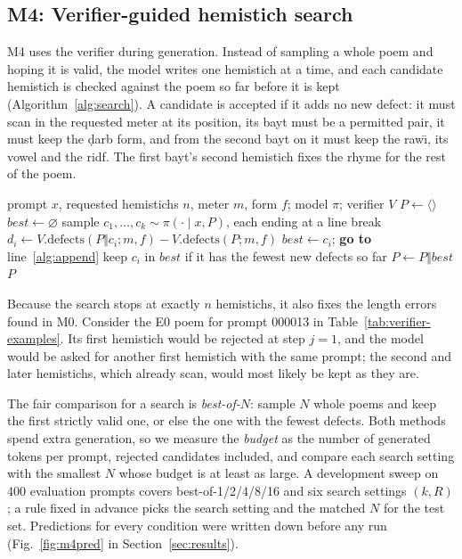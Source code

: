 \subsection{M4: Verifier-guided hemistich search}
\label{sec:m4}
M4 uses the verifier during generation. Instead of sampling a whole poem and hoping it is valid, the model writes one
hemistich at a time, and each candidate hemistich is checked against the poem so far before it is kept
(Algorithm~\ref{alg:search}). A candidate is accepted if it adds no new defect: it must scan in the requested meter at
its position, its bayt must be a permitted pair, it must keep the \d{d}arb form, and from the second bayt on it must
keep the raw\={\i}, its vowel and the ridf. The first bayt's second hemistich fixes the rhyme for the rest of the poem.

\begin{algorithm}[t]
\caption{Hemistich search with $k$ candidates per round and at most $R$ rounds}
\label{alg:search}
\footnotesize
\begin{algorithmic}[1]
\Require prompt $x$, requested hemistichs $n$, meter $m$, form $f$; model $\pi$; verifier $V$
\State $P \gets \langle\rangle$ 
  \State $best \gets \varnothing$
    \State sample $c_1,\dots,c_k \sim \pi(\cdot \mid x, P)$, each ending at a line break
      \State $d_i \gets V.\mathrm{defects}(P \Vert c_i; m, f) - V.\mathrm{defects}(P; m, f)$
       \State $best \gets c_i$; \textbf{go to} line~\ref{alg:append} \EndIf
      \State keep $c_i$ in $best$ if it has the fewest new defects so far
    \EndFor
  \EndFor
  \State $P \gets P \Vert best$ \label{alg:append} 
\EndFor
\State \Return $P$ 
\end{algorithmic}
\end{algorithm}

Because the search stops at exactly $n$ hemistichs, it also fixes the length errors found in M0. Consider the E0 poem
for prompt 000013 in Table~\ref{tab:verifier-examples}. Its first hemistich would be rejected at step $j=1$, and the
model would be asked for another first hemistich with the same prompt; the second and later hemistichs, which already
scan, would most likely be kept as they are.

The fair comparison for a search is \emph{best-of-$N$}: sample $N$ whole poems and keep the first strictly valid one,
or else the one with the fewest defects. Both methods spend extra generation, so we measure the \emph{budget} as the
number of generated tokens per prompt, rejected candidates included, and compare each search setting with the
smallest $N$ whose budget is at least as large. A development sweep on 400 evaluation prompts covers best-of-1/2/4/8/16
and six search settings $(k,R)$; a rule fixed in advance picks the search setting and the matched $N$ for the test set.
Predictions for every condition were written down before any run (Fig.~\ref{fig:m4pred} in Section~\ref{sec:results}).

